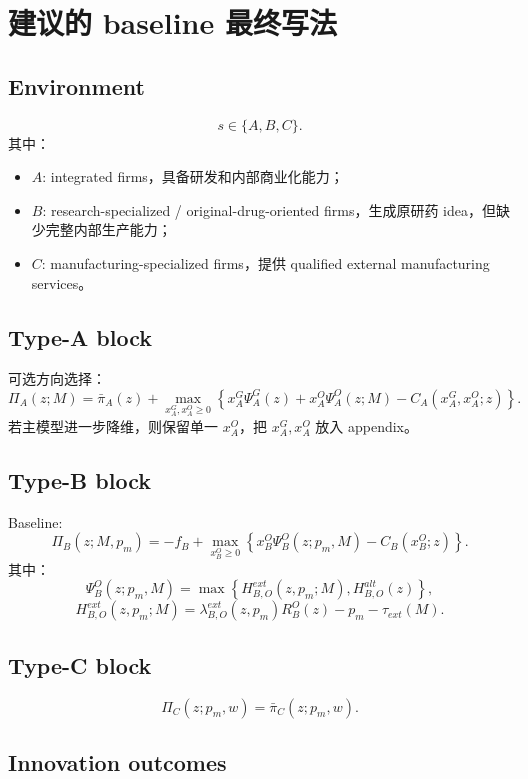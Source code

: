 \documentclass[12pt]{article}
\begin{document}
\section{建议的 baseline 最终写法}

\subsection{Environment}

\[
s\in\{A,B,C\}.
\]
其中：
\begin{itemize}
    \item $A$: integrated firms，具备研发和内部商业化能力；
    \item $B$: research-specialized / original-drug-oriented firms，生成原研药 idea，但缺少完整内部生产能力；
    \item $C$: manufacturing-specialized firms，提供 qualified external manufacturing services。
\end{itemize}

\subsection{Type-A block}

可选方向选择：
\[
\Pi_A(z;M)
=
\bar{\pi}_A(z)
+
\max_{x_A^G,x_A^O\ge 0}
\left\{
x_A^G\Psi_A^G(z)
+
x_A^O\Psi_A^O(z;M)
-
C_A(x_A^G,x_A^O;z)
\right\}.
\]
若主模型进一步降维，则保留单一 $x_A^O$，把 $x_A^G,x_A^O$ 放入 appendix。

\subsection{Type-B block}

Baseline:
\[
\Pi_B(z;M,p_m)
=
-f_B
+
\max_{x_B^O\ge 0}
\left\{
x_B^O\Psi_B^O(z;p_m,M)
-
C_B(x_B^O;z)
\right\}.
\]
其中：
\[
\Psi_B^O(z;p_m,M)
=
\max
\left\{
H_{B,O}^{ext}(z,p_m;M),
H_{B,O}^{alt}(z)
\right\},
\]
\[
H_{B,O}^{ext}(z,p_m;M)
=
\lambda_{B,O}^{ext}(z,p_m)R_B^O(z)
-
p_m
-
\tau_{ext}(M).
\]

\subsection{Type-C block}

\[
\Pi_C(z;p_m,w)
=
\bar{\pi}_C(z;p_m,w).
\]

\subsection{Innovation outcomes}
\end{document}

